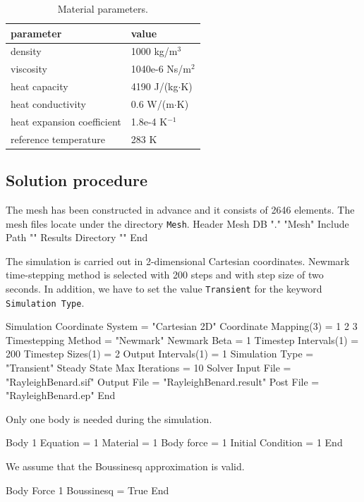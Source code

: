 \begin{flushleft}
\begin{table}[h]
\caption{Material parameters.}
\label{tb:matpar}
\begin{center}
\begin{tabular}{ll} \hline
parameter  & value \\ \hline
density & 1000 kg/m$^{3}$ \\
viscosity & 1040e-6 Ns/m$^{2}$ \\
heat capacity & 4190 J/(kg$\cdot$K) \\
heat conductivity & 0.6 W/(m$\cdot$K)       \\
heat expansion coefficient & 1.8e-4 K$^{-1}$      \\ 
reference temperature & 283 K       \\ \hline
\end{tabular}
\end{center}
\end{table}

\subsection*{Solution procedure}

The mesh has been constructed in advance and it consists of 2646 elements. 
The mesh files locate under the directory {\tt Mesh}.
\ttbegin
Header
  Mesh DB "." "Mesh"
  Include Path ""
  Results Directory ""
End
\ttend

The simulation is carried out in 2-dimensional Cartesian coordinates. Newmark time-stepping method is selected with 200 steps and with step size of two seconds. In addition, we have to set the value {\tt Transient} for the keyword {\tt Simulation Type}.

\ttbegin
Simulation
  Coordinate System = "Cartesian 2D" 
  Coordinate Mapping(3) = 1 2 3
  Timestepping Method = "Newmark"
  Newmark Beta = 1
  Timestep Intervals(1) = 200
  Timestep Sizes(1) = 2
  Output Intervals(1) = 1
  Simulation Type = "Transient" 
  Steady State Max Iterations = 10
  Solver Input File = "RayleighBenard.sif"
  Output File = "RayleighBenard.result" 
  Post File = "RayleighBenard.ep" 
End
\ttend

Only one body is needed during the simulation.

\ttbegin
Body 1
  Equation = 1
  Material = 1
  Body force = 1
  Initial Condition = 1
End
\ttend

We assume that the Boussinesq approximation is valid.

\ttbegin
Body Force 1
  Boussinesq = True
End
\ttend


\end{flushleft}
